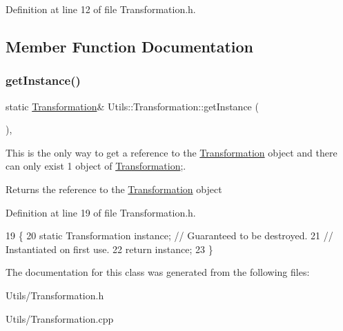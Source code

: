 Definition at line 12 of file Transformation.\+h.



\subsection{Member Function Documentation}
\mbox{\label{classUtils_1_1Transformation_a03b9f5b948a515ced74861fa154a3ce4}} 
\subsubsection{\texorpdfstring{get\+Instance()}{getInstance()}}
{\footnotesize\ttfamily static \hyperlink{classUtils_1_1Transformation}{Transformation}\& Utils\+::\+Transformation\+::get\+Instance (\begin{DoxyParamCaption}{ }\end{DoxyParamCaption})\hspace{0.3cm}{\ttfamily [inline]}, {\ttfamily [static]}}



This is the only way to get a reference to the \hyperlink{classUtils_1_1Transformation}{Transformation} object and there can only exist 1 object of \hyperlink{classUtils_1_1Transformation}{Transformation};. 

\begin{DoxyReturn}{Returns}
the reference to the \hyperlink{classUtils_1_1Transformation}{Transformation} object 
\end{DoxyReturn}


Definition at line 19 of file Transformation.\+h.


\begin{DoxyCode}
19                                             \{
20                 \textcolor{keyword}{static} Transformation    instance; \textcolor{comment}{// Guaranteed to be destroyed.}
21                 \textcolor{comment}{// Instantiated on first use.}
22                 \textcolor{keywordflow}{return} instance;
23         \}
\end{DoxyCode}


The documentation for this class was generated from the following files\+:\begin{DoxyCompactItemize}
\item 
Utils/Transformation.\+h\item 
Utils/Transformation.\+cpp\end{DoxyCompactItemize}
